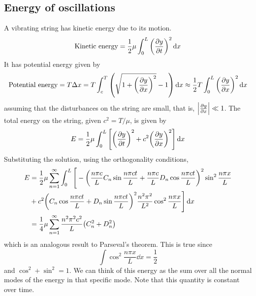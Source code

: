 \subsection{Energy of oscillations}
A vibrating string has kinetic energy due to its motion.
\[
	\text{Kinetic energy} = \frac{1}{2} \mu \int_0^L \qty(\pdv{y}{t})^2 \dd{x}
\]
It has potential energy given by
\[
	\text{Potential energy} = T \Delta x = T \int_c^T \qty(\sqrt{1 + \qty(\pdv{y}{x})^2}-1)\dd{x} \approx \frac{1}{2} T \int_0^L \qty(\pdv{y}{x})^2 \dd{x}
\]
assuming that the disturbances on the string are small, that is, \( \abs{\pdv{y}{x}} \ll 1 \).
The total energy on the string, given \( c^2 = T/\mu \), is given by
\[
	E = \frac{1}{2}\mu \int_0^L \qty[\qty(\pdv{y}{t})^2 + c^2 \qty(\pdv{y}{x})^2] \dd{x}
\]
Substituting the solution, using the orthogonality conditions,
\begin{align*}
	E & = \frac{1}{2}\mu \sum_{n=1}^\infty \int_0^L \Bigg[-\qty(\frac{n \pi c}{L} C_n \sin \frac{n \pi c t}{L} + \frac{n \pi c}{L} D_n \cos \frac{n \pi c t}{L})^2 \sin^2 \frac{n \pi x}{L} \\
	  & + c^2 \qty(C_n \cos \frac{n \pi c t}{L} + D_n \sin \frac{n \pi c t}{L})^2 \frac{n^2 \pi^2}{L^2} \cos^2 \frac{n \pi x}{L} \Bigg] \dd{x}                                              \\
	  & = \frac{1}{4} \mu \sum_{n=1}^\infty \frac{n^2 \pi^2 c^2}{L} \qty(C_n^2 + D_n^2)
\end{align*}
which is an analogous result to Parseval's theorem.
This is true since \[
	\int \cos^2 \frac{n \pi x}{L}\dd{x} = \frac{1}{2}
\] and \( \cos^2 + \sin^2 = 1 \).
We can think of this energy as the sum over all the normal modes of the energy in that specific mode.
Note that this quantity is constant over time.

